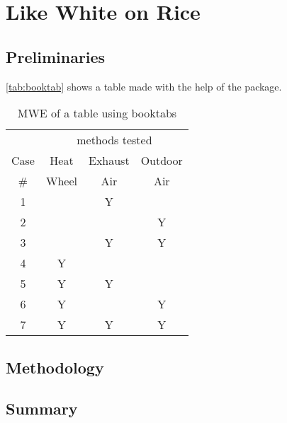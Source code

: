 \chapter{Like White on Rice}
\label{ch:rice}

\lipsum[1-3]

\section{Preliminaries}

\lipsum[5]
\autoref{tab:booktab} shows a table made with the help of the  package.

\begin{table}[htbp]
    \centering
    \begin{tabular}{*4c}
        \toprule
        & \multicolumn{3}{c}{methods tested} \\
        \cmidrule(lr){2-4}
        Case & Heat  & Exhaust & Outdoor \\    
        \#   & Wheel & Air     & Air     \\
        \midrule
        1 &        &    Y    &        \\
        2 &        &        &    Y    \\
        3 &        &    Y    &    Y    \\
        4 &    Y    &        &        \\
        5 &    Y    &    Y    &        \\
        6 &    Y    &        &    Y    \\
        7 &    Y    &    Y    &    Y    \\
        \bottomrule
    \end{tabular}
    \caption{MWE of a table using booktabs}
    \label{tab:booktab}
\end{table}

\section{Methodology}

\lipsum[4-5]

\section{Summary}

\lipsum[6]